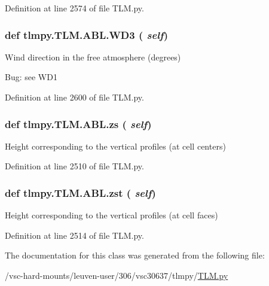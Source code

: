 Definition at line 2574 of file TLM.py.\hypertarget{classtlmpy_1_1TLM_1_1ABL_af41abd6b2f02e097ff4000c772941f78}{
\subsubsection[{WD3}]{\setlength{\rightskip}{0pt plus 5cm}def tlmpy.TLM.ABL.WD3 ( {\em self})}}
\label{classtlmpy_1_1TLM_1_1ABL_af41abd6b2f02e097ff4000c772941f78}
\begin{DoxyVerb}
Wind direction in the free atmosphere (degrees)

Bug: see WD1
\end{DoxyVerb}
 

Definition at line 2600 of file TLM.py.\hypertarget{classtlmpy_1_1TLM_1_1ABL_a709d22266f88a483f11fee887b8bebe3}{
\subsubsection[{zs}]{\setlength{\rightskip}{0pt plus 5cm}def tlmpy.TLM.ABL.zs ( {\em self})}}
\label{classtlmpy_1_1TLM_1_1ABL_a709d22266f88a483f11fee887b8bebe3}
\begin{DoxyVerb}Height corresponding to the vertical profiles (at cell centers)\end{DoxyVerb}
 

Definition at line 2510 of file TLM.py.\hypertarget{classtlmpy_1_1TLM_1_1ABL_ad840fad78ebe1b37cd31f67e74a6519c}{
\subsubsection[{zst}]{\setlength{\rightskip}{0pt plus 5cm}def tlmpy.TLM.ABL.zst ( {\em self})}}
\label{classtlmpy_1_1TLM_1_1ABL_ad840fad78ebe1b37cd31f67e74a6519c}
\begin{DoxyVerb}Height corresponding to the vertical profiles (at cell faces)\end{DoxyVerb}
 

Definition at line 2514 of file TLM.py.

The documentation for this class was generated from the following file:\begin{DoxyCompactItemize}
\item 
/vsc-\/hard-\/mounts/leuven-\/user/306/vsc30637/tlmpy/\hyperlink{TLM_8py}{TLM.py}\end{DoxyCompactItemize}
